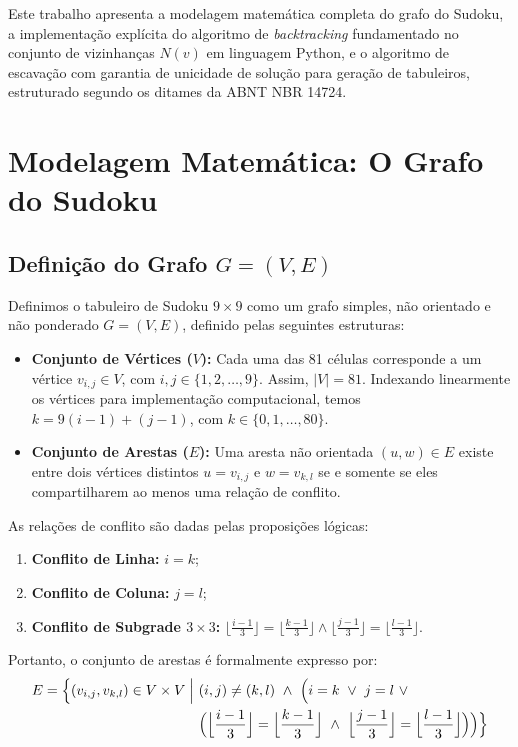 \documentclass[12pt, a4paper]{article}
\begin{document}
Este trabalho apresenta a modelagem matemática completa do grafo do Sudoku, a implementação explícita do algoritmo de \textit{backtracking} fundamentado no conjunto de vizinhanças $N(v)$ em linguagem Python, e o algoritmo de escavação com garantia de unicidade de solução para geração de tabuleiros, estruturado segundo os ditames da ABNT NBR 14724.

\section{Modelagem Matemática: O Grafo do Sudoku}

\subsection{Definição do Grafo $G = (V, E)$}
Definimos o tabuleiro de Sudoku $9 \times 9$ como um grafo simples, não orientado e não ponderado $G = (V, E)$, definido pelas seguintes estruturas:
\begin{itemize}
    \item \textbf{Conjunto de Vértices ($V$):} Cada uma das 81 células corresponde a um vértice $v_{i,j} \in V$, com $i, j \in \{1, 2, \dots, 9\}$. Assim, $|V| = 81$. Indexando linearmente os vértices para implementação computacional, temos $k = 9(i-1) + (j-1)$, com $k \in \{0, 1, \dots, 80\}$.
    \item \textbf{Conjunto de Arestas ($E$):} Uma aresta não orientada $(u, w) \in E$ existe entre dois vértices distintos $u = v_{i,j}$ e $w = v_{k,l}$ se e somente se eles compartilharem ao menos uma relação de conflito.
\end{itemize}

As relações de conflito são dadas pelas proposições lógicas:
\begin{enumerate}
    \item \textbf{Conflito de Linha:} $i = k$;
    \item \textbf{Conflito de Coluna:} $j = l$;
    \item \textbf{Conflito de Subgrade $3 \times 3$:} $\lfloor \frac{i-1}{3} \rfloor = \lfloor \frac{k-1}{3} \rfloor \land \lfloor \frac{j-1}{3} \rfloor = \lfloor \frac{l-1}{3} \rfloor$.
\end{enumerate}

Portanto, o conjunto de arestas é formalmente expresso por:
\begin{equation}
	\begin{aligned}
		E = \Bigl\{ (v_{i,j}, v_{k,l}) \in V \times V \Bigm| &\ (i,j) \neq (k,l) \ \land \ \Bigl( i=k \ \lor \ j=l \ \lor \\ 
		&\ \Bigl( \Big\lfloor\frac{i-1}{3}\Big\rfloor = \Big\lfloor\frac{k-1}{3}\Big\rfloor \ \land \ 
		\Big\lfloor\frac{j-1}{3}\Big\rfloor = \Big\lfloor\frac{l-1}{3}\Big\rfloor \Bigr) \Bigr) \Bigr\}
	\end{aligned}
\end{equation}
\end{document}
